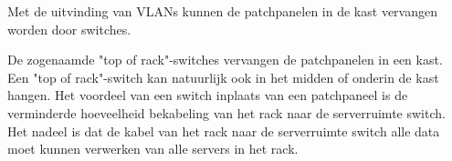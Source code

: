 Met de uitvinding van VLANs kunnen de patchpanelen in de kast vervangen worden door switches.

De zogenaamde "top of rack"-switches vervangen de patchpanelen in een kast. Een "top of rack"-switch kan natuurlijk ook in het midden of onderin de kast hangen. Het voordeel van een switch inplaats van een patchpaneel is de verminderde hoeveelheid bekabeling van het rack naar de serverruimte switch. Het nadeel is dat de kabel van het rack naar de serverruimte switch alle data moet kunnen verwerken van alle servers in het rack.
